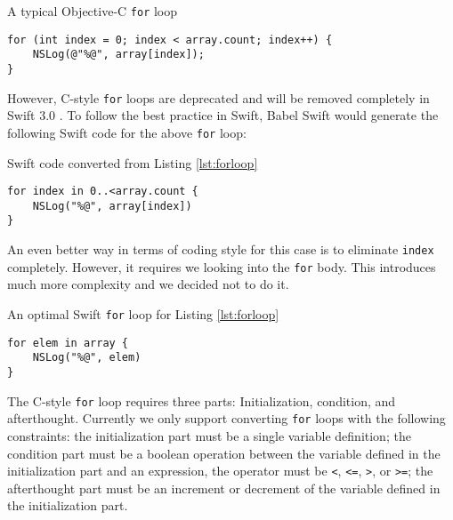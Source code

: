 \documentclass{sfuthesis}
\begin{document}
\begin{listing}[H]
\caption{A typical Objective-C \texttt{for} loop}
\label{lst:forloop}
\begin{verbatim}
for (int index = 0; index < array.count; index++) {
    NSLog(@"%@", array[index]);
}
\end{verbatim}
\end{listing}

However, C-style \texttt{for} loops are deprecated and will be removed completely in Swift 3.0 \cite{removecforloops}. To follow the best practice in Swift, Babel Swift would generate the following Swift code for the above \texttt{for} loop:

\begin{listing}[H]
\caption{Swift code converted from Listing \ref{lst:forloop}}
\begin{verbatim}
for index in 0..<array.count {
    NSLog("%@", array[index])
}
\end{verbatim}
\end{listing}

An even better way in terms of coding style for this case is to eliminate \texttt{index} completely. However, it requires we looking into the \texttt{for} body. This introduces much more complexity and we decided not to do it.

\begin{listing}[H]
\caption{An optimal Swift \texttt{for} loop for Listing \ref{lst:forloop}}
\begin{verbatim}
for elem in array {
    NSLog("%@", elem)
}
\end{verbatim}
\end{listing}

The C-style \texttt{for} loop requires three parts: Initialization, condition, and afterthought. Currently we only support converting \texttt{for} loops with the following constraints: the initialization part must be a single variable definition; the condition part must be a boolean operation between the variable defined in the initialization part and an expression, the operator must be \texttt{<}, \texttt{<=}, \texttt{>}, or \texttt{>=}; the afterthought part must be an increment or decrement of the variable defined in the initialization part.


%
%
%
\end{document}
